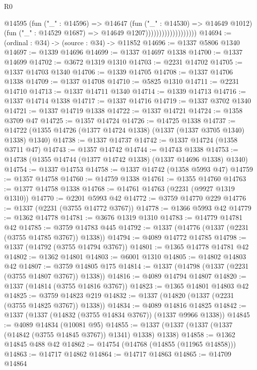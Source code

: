 \begin{lexlean}{R0}
\begin{coremodule}
                                    @14595
                                      (fun ("_" : @14596) =>
                                      @14647
                                        (fun ("_" : @14530) => @14649 @1012)
                                        (fun ("_" : @14529 @1687) => @14649 @1207)))))))))))))))))))
@14694 := (ordinal : @34) -> (source : @34) -> @11852
@14696 := @1337 @5806 @1340
@14697 := @1339 @14696
@14699 := @1337 @14697 @1338
@14700 := @1337 @14699
@14702 := @3672 @1319 @1310
@14703 := @2231 @14702
@14705 := @1337 @14703 @1340
@14706 := @1339 @14705
@14708 := @1337 @14706 @1338
@14709 := @1337 @14708
@14710 := @5825 @1310
@14711 := @2231 @14710
@14713 := @1337 @14711 @1340
@14714 := @1339 @14713
@14716 := @1337 @14714 @1338
@14717 := @1337 @14716
@14719 := @1337 @3702 @1340
@14721 := @1337 @14719 @1338
@14722 := @1337 @14721
@14724 := @1358 @3709 @47
@14725 := @1357 @14724
@14726 := @14725 @1338
@14737 := @14722 (@1355 @14726 (@1377 @14724 @1338) (@1337 (@1337 @3705 @1340) @1338) @1340)
@14738 := @1337 @14737
@14742 := @1337 @14724 (@1358 @3711 @47)
@14743 := @1357 @14742
@14744 := @14743 @1338
@14753 := @14738 (@1355 @14744 (@1377 @14742 @1338) (@1337 @14696 @1338) @1340)
@14754 := @1337 @14753
@14758 := @1337 @14742 (@1358 @5993 @47)
@14759 := @1357 @14758
@14760 := @14759 @1338
@14761 := @1355 @14760
@14763 := @1377 @14758 @1338
@14768 := @14761 @14763 (@2231 (@9927 @1319 @1310))
@14770 := @2201 @5993 @42
@14772 := @3759 @14770 @229
@14776 := @1337 (@2231 (@3755 @14772 @3767))
@14778 := @1366 @5993 @42
@14779 := @1362 @14778
@14781 := @3676 @1319 @1310
@14783 := @14779 @14781 @42
@14785 := @3759 @14783 @445
@14792 := @1337 (@14776 (@1337 (@2231 (@3755 @14785 @3767)) @1338))
@14794 := @4089 @14772 @14785
@14798 := @1337 (@14792 (@3755 @14794 @3767))
@14801 := @1365 @14778 @14781 @42
@14802 := @1362 @14801
@14803 := @6001 @1310
@14805 := @14802 @14803 @42
@14807 := @3759 @14805 @175
@14814 := @1337 (@14798 (@1337 (@2231 (@3755 @14807 @3767)) @1338))
@14816 := @4089 @14794 @14807
@14820 := @1337 (@14814 (@3755 @14816 @3767))
@14823 := @1365 @14801 @14803 @42
@14825 := @3759 @14823 @219
@14832 := @1337 (@14820 (@1337 (@2231 (@3755 @14825 @3767)) @1338))
@14834 := @4089 @14816 @14825
@14842 := @1337 (@1337 (@14832 (@3755 @14834 @3767)) (@1337 @9966 @1338))
@14845 := @4089 @14834 (@10081 @95)
@14855 := @1337 (@1337 (@1337 (@1337 (@14842 (@3755 @14845 @3767)) @1341) @1338) @1338)
@14858 := @1362 @14845 @488 @42
@14862 := @14754 (@14768 (@14855 (@11965 @14858)))
@14863 := @14717 @14862
@14864 := @14717 @14863
@14865 := @14709 @14864

\end{coremodule}
\end{lexlean}
